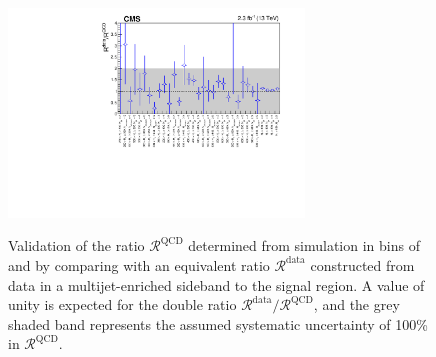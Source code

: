 \begin{figure}[!t]
  \begin{center}
    \includegraphics[width=0.7\textwidth]{figures/qcd/v1/DoubleRatioQCD_noEmpty} \\
  \end{center}
  \caption{Validation of the ratio $\mathcal{R}^\text{QCD}$ determined
    from simulation in bins of \njet and \scalht by comparing with an
    equivalent ratio $\mathcal{R}^\text{data}$ constructed from data 
    in a multijet-enriched sideband to the signal region. A value of
    unity is expected for the double ratio $\mathcal{R}^\text{data} /
    \mathcal{R}^\text{QCD}$, and the grey shaded band represents the
    assumed systematic uncertainty of 100\% in
    $\mathcal{R}^\text{QCD}$. 
  }
  \label{fig:qcd} 
\end{figure}


